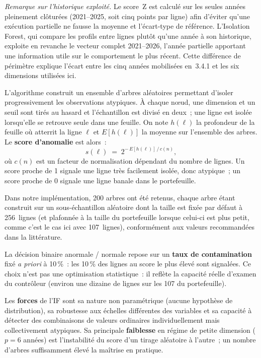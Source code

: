 \textit{Remarque sur l'historique exploit\'e.} Le score~Z est calcul\'e sur
les seules ann\'ees pleinement cl\^otur\'ees (2021--2025, soit cinq points par
ligne) afin d'\'eviter qu'une ex\'ecution partielle ne fausse la moyenne et
l'\'ecart-type de r\'ef\'erence. L'Isolation Forest, qui compare les profils
entre lignes plut\^ot qu'une ann\'ee \`a son historique, exploite en revanche
le vecteur complet 2021--2026, l'ann\'ee partielle apportant une information
utile sur le comportement le plus r\'ecent. Cette diff\'erence de p\'erim\`etre
explique l'\'ecart entre les cinq ann\'ees mobilis\'ees en~3.4.1 et les
six dimensions utilis\'ees ici.

L'algorithme construit un ensemble d'arbres al\'eatoires permettant d'isoler
progressivement les observations atypiques. \`A chaque n\oe{}ud, une
dimension et un seuil sont tir\'es au hasard et l'\'echantillon est divis\'e
en deux~; une ligne est isol\'ee lorsqu'elle se retrouve seule dans une
feuille. On note $h(\ell)$ la profondeur de la feuille o\`u atterrit la ligne
$\ell$ et $E[h(\ell)]$ la moyenne sur l'ensemble des arbres. Le
\textbf{score d'anomalie} est alors~:
$$
s(\ell) \;=\; 2^{-\,E[h(\ell)]\,/\,c(n)},
$$
o\`u $c(n)$ est un facteur de normalisation d\'ependant du nombre de lignes.
Un score proche de 1 signale une ligne tr\`es facilement isol\'ee, donc
atypique~; un score proche de 0 signale une ligne banale dans le portefeuille.

Dans notre impl\'ementation, 200 arbres ont \'et\'e retenus, chaque arbre
\'etant construit sur un sous-\'echantillon al\'eatoire dont la taille est
fix\'ee par d\'efaut \`a 256~lignes (et plafonn\'ee \`a la taille du
portefeuille lorsque celui-ci est plus petit, comme c'est le cas ici avec
107~lignes), conform\'ement aux valeurs recommand\'ees dans la litt\'erature.

La d\'ecision binaire \og anormale / normale \fg{} repose sur un \textbf{taux
de contamination} fix\'e \textit{a priori} \`a 10\,\%~: les 10\,\% des lignes
au score le plus \'elev\'e sont signal\'ees. Ce choix n'est pas une
optimisation statistique~: il refl\`ete la capacit\'e r\'eelle d'examen du
contr\^oleur (environ une dizaine de lignes sur les 107 du portefeuille).

Les \textbf{forces} de l'IF sont sa nature non param\'etrique (aucune
hypoth\`ese de distribution), sa robustesse aux \'echelles diff\'erentes des
variables et sa capacit\'e \`a d\'etecter des combinaisons de valeurs
ordinaires individuellement mais collectivement atypiques. Sa principale
\textbf{faiblesse} en r\'egime de petite dimension ($p=6$ ann\'ees) est
l'instabilit\'e du score d'un tirage al\'eatoire \`a l'autre~; un nombre
d'arbres suffisamment \'elev\'e la ma\^itrise en pratique.

